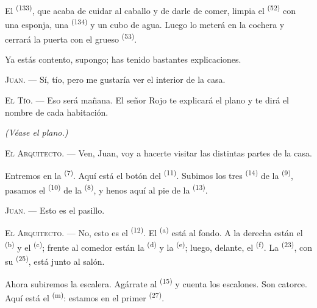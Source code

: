 El  \textsuperscript{(133)}, que acaba de cuidar al caballo y
de darle de comer, limpia el  \textsuperscript{(52)} con una esponja,
una  \textsuperscript{(134)} y un cubo de agua. Luego lo
meterá en la cochera y cerrará la puerta con el grueso 
\textsuperscript{(53)}.

Ya estás contento, supongo; has tenido bastantes explicaciones.

\textsc{Juan}. --- Sí, tío, pero me gustaría ver el interior de la casa.

\textsc{El Tío}. --- Eso será mañana. El señor Rojo te explicará el plano y
te dirá el nombre de cada habitación.

\VUsaut{3.0mm}
\VUsaut{2.4mm}

{\centering\textit{(Véase el plano.)}\par}
\VUsaut{2.4mm}

\textsc{El Arquitecto}. --- Ven, Juan, voy a hacerte visitar las distintas
partes de la casa.

Entremos en la  \textsuperscript{(7)}. Aquí está el botón del
 \textsuperscript{(11)}. Subimos los tres 
\textsuperscript{(14)} de la  \textsuperscript{(9)}, pasamos el
 \textsuperscript{(10)} de la 
\textsuperscript{(8)}, y henos aquí al pie de la  \textsuperscript{(13)}.

\textsc{Juan}. --- Esto es el pasillo.

\textsc{El Arquitecto}. --- No, esto es el  \textsuperscript{(12)}.
El  \textsuperscript{(a)} está al fondo. A la derecha están el
 \textsuperscript{(b)} y el  \textsuperscript{(c)}; frente al
comedor están la  \textsuperscript{(d)} y la 
\textsuperscript{(e)}; luego, delante, el  \textsuperscript{(f)}. La
 \textsuperscript{(23)}, con su 
\textsuperscript{(25)}, está junto al salón.

Ahora subiremos la escalera. Agárrate al  \textsuperscript{(15)} y
cuenta los escalones. Son catorce. Aquí está el 
\textsuperscript{(m)}: estamos en el primer  \textsuperscript{(27)}.

